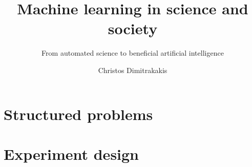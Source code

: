 \documentclass[a4paper,twoside]{book}
\title{Machine learning in science and society}
\subtitle{From automated science to beneficial artificial intelligence}
\author[C. Dimitrakakis]{Christos Dimitrakakis}
\begin{document}
\begin{frame}
  \titlepage
\end{frame}


\chapter{Structured problems}

\chapter{Experiment design}
\end{document}
